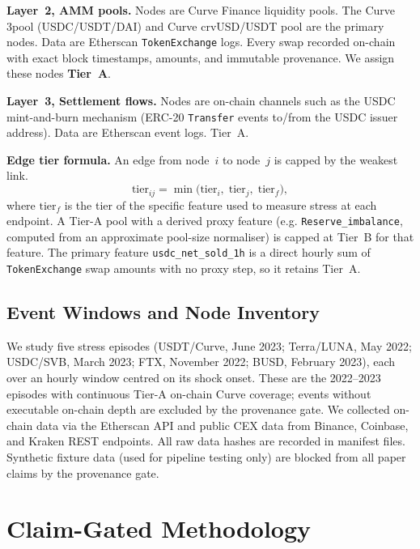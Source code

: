 \documentclass[sigconf,anonymous]{acmart}
\begin{document}
\textbf{Layer~2, AMM pools.}  Nodes are Curve Finance liquidity pools.  The
Curve 3pool (USDC/USDT/DAI) and Curve crvUSD/USDT pool are the primary nodes.
Data are Etherscan \texttt{TokenExchange} logs. Every swap recorded on-chain
with exact block timestamps, amounts, and immutable provenance.  We assign
these nodes \textbf{Tier~A}.

\textbf{Layer~3, Settlement flows.}  Nodes are on-chain channels such as the
USDC mint-and-burn mechanism (ERC-20 \texttt{Transfer} events to/from the USDC
issuer address).  Data are Etherscan event logs.  Tier~A.

\textbf{Edge tier formula.}  An edge from node~$i$ to node~$j$ is capped by
the weakest link.
\begin{equation}
  \text{tier}_{ij} = \min\!\bigl(\text{tier}_i,\;\text{tier}_j,\;\text{tier}_f\bigr),
\end{equation}
where $\text{tier}_f$ is the tier of the specific feature used to measure
stress at each endpoint.  A Tier-A pool with a derived proxy feature (e.g.
\texttt{Reserve\_imbalance}, computed from an approximate pool-size
normaliser) is capped at Tier~B for that feature.  The primary feature
\texttt{usdc\_net\_sold\_1h} is a direct hourly sum of \texttt{TokenExchange}
swap amounts with no proxy step, so it retains Tier~A.



\subsection{Event Windows and Node Inventory}

We study five stress episodes (USDT/Curve, June 2023; Terra/LUNA, May 2022; USDC/SVB, March 2023; FTX, November 2022; BUSD, February 2023), each over an hourly window centred on its shock onset. These are the 2022--2023 episodes with continuous Tier-A on-chain Curve coverage; events without executable on-chain depth are excluded by the provenance gate.
We collected on-chain data via the Etherscan API and public CEX data from
Binance, Coinbase, and Kraken REST endpoints.  All raw data hashes are
recorded in manifest files. Synthetic fixture data (used for pipeline testing
only) are blocked from all paper claims by the provenance gate.






\section{Claim-Gated Methodology}
\label{sec:method}
\end{document}
